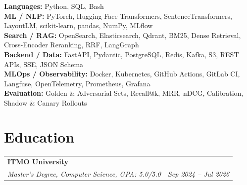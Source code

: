 \documentclass[a4paper,10pt]{article}
\makeatletter
\newcommand{\resumeSubheading}[4]{
    \vspace{-3pt}
    \begin{tabular*}{\textwidth}{l@{\extracolsep{\fill}}r}
    \textbf{#1} & #2 \\
    \textit{\small#3} & \textit{\small #4} \\
    \end{tabular*}
    \vspace{-5pt}
}
\makeatother
\begin{document}
\textbf{Languages:} Python, SQL, Bash \\
\textbf{ML / NLP:} PyTorch, Hugging Face Transformers, SentenceTransformers, LayoutLM, scikit-learn, pandas, NumPy, MLflow \\
\textbf{Search / RAG:} OpenSearch, Elasticsearch, Qdrant, BM25, Dense Retrieval, Cross-Encoder Reranking, RRF, LangGraph \\
\textbf{Backend / Data:} FastAPI, Pydantic, PostgreSQL, Redis, Kafka, S3, REST APIs, SSE, JSON Schema \\
\textbf{MLOps / Observability:} Docker, Kubernetes, GitHub Actions, GitLab CI, Langfuse, OpenTelemetry, Prometheus, Grafana \\
\textbf{Evaluation:} Golden \& Adversarial Sets, Recall@k, MRR, nDCG, Calibration, Shadow \& Canary Rollouts

\section{Education}

\vspace{4pt}
\resumeSubheading
{ITMO University}{}
{Master's Degree, Computer Science, GPA: 5.0/5.0}{Sep 2024 -- Jul 2026}
\end{document}
